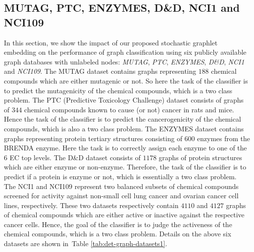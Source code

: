 \documentclass[journal]{IEEEtran}
\theoremstyle{definition}
\newcommand{\tab}[1]{Table \ref{#1}}
\begin{document}
\subsection{MUTAG, PTC, ENZYMES, D\&D, NCI1 and NCI109}
\label{sec:results:unlabeled}
In this section, we show the impact of our proposed stochastic graphlet embedding on the performance of graph classification using six publicly available graph databases with unlabeled nodes: \emph{MUTAG}, \emph{PTC}, \emph{ENZYMES}, \emph{D\&D}, {\emph{NCI1} and \emph{NCI109}}. The MUTAG dataset contains graphs representing $188$ chemical compounds which are either mutagenic or not. So here the task of the classifier is to predict the mutagenicity of the chemical compounds, which is a two class problem. The PTC (Predictive Toxicology Challenge) dataset consists of graphs of $344$ chemical compounds known to cause (or not) cancer in rats and mice. Hence the task of the classifier is to predict the cancerogenicity of the chemical compounds, which is also a two class problem. The ENZYMES dataset contains graphs representing protein tertiary structures consisting of $600$ enzymes from the BRENDA enzyme. Here the task is to correctly assign each enzyme to one of the $6$ EC top levels. The D\&D dataset consists of $1178$ graphs of protein structures which are either enzyme or non-enzyme. Therefore, the task of the classifier is to predict if a protein is enzyme or not, which is essentially a two class problem. {The NCI1 and NCI109 represent two balanced subsets of chemical compounds screened for activity against non-small cell lung cancer and ovarian cancer cell lines, respectively. These two datasets respectively contain $4110$ and $4127$ graphs of chemical compounds which are either active or inactive against the respective cancer cells. Hence, the goal of the classifier is to judge the activeness of the chemical compounds, which is a two class problem.} Details on the above six datasets are shown in~\tab{tab:det-graph-datasets1}.
\end{document}
